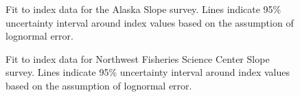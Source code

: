 \documentclass[
]{scrartcl}
\begin{document}
\begin{figure}[H]


\caption{\label{fig-index-akslope}Fit to index data for the Alaska Slope
survey. Lines indicate 95\% uncertainty interval around index values
based on the assumption of lognormal error.}

\end{figure}%

\begin{figure}[H]


\caption{\label{fig-index-nwslope}Fit to index data for Northwest
Fisheries Science Center Slope survey. Lines indicate 95\% uncertainty
interval around index values based on the assumption of lognormal
error.}

\end{figure}%
\end{document}
